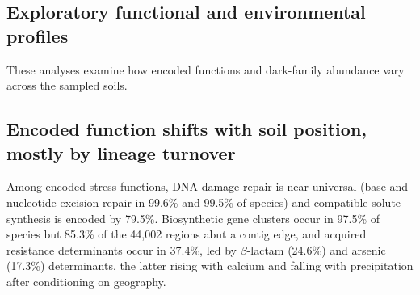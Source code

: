 \subsection*{Exploratory functional and environmental profiles}
These analyses examine how encoded functions and dark-family abundance vary across the sampled soils.

\subsection*{Encoded function shifts with soil position, mostly by lineage turnover}

Among encoded stress functions, DNA-damage repair
is near-universal (base and nucleotide excision repair in 99.6\% and 99.5\% of species) and
compatible-solute synthesis is encoded by 79.5\%. Biosynthetic gene clusters occur in 97.5\% of
species but 85.3\% of the 44{,}002 regions abut a contig edge, and acquired resistance determinants
occur in 37.4\%, led by $\beta$-lactam (24.6\%) and arsenic (17.3\%) determinants, the latter rising
with calcium and falling with precipitation after conditioning on geography.


